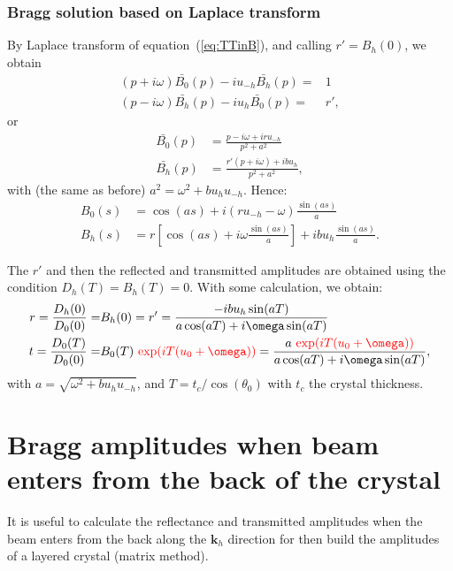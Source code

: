 \documentclass[preprint]{iucr}              %
\newcommand{\inred}[1]{{\color{red}#1}}
\begin{document}
\subsubsection{Bragg solution based on Laplace transform}By Laplace transform of equation~(\ref{eq:TTinB}), and calling \inred{$r'=B_h(0)$}, we obtain
\begin{subequations}
\label{eq:TTbraggLaplace}
\begin{align}
(p + i \omega) \bar{B_0}(p) - i u_{-h} \bar{B_h}(p)= & 1 \\
(p - i \omega) \bar{B_h}(p) - i u_{h} \bar{B_0}(p)= & r',
\end{align}
\end{subequations}
or 
\begin{subequations}
\begin{align}
\bar{B_0}(p) &= \frac{p - i \omega + i r u_{-h}}{p^2 + a^2} \\
\bar{B_h}(p) &= \frac{r' (p + i \omega) + i b u_h}{p^2 + a^2},
\end{align}
\end{subequations}
with \inred{(the same as before)} $a^2=\omega^2+b u_h u_{-h}$. Hence:
\begin{subequations}
\begin{align}
B_0(s) &= \cos(a s) + i (r u_{-h} - \omega) \frac{\sin(a s)}{a}\\
B_h(s) &= r [\cos(a s) + i \omega \frac{\sin(a s)}{a}] + i b u_h \frac{\sin(a s)}{a}.
\end{align}
\end{subequations}

The $r'$ and then the reflected and transmitted amplitudes are obtained using the condition $D_h(T)=B_h(T)=0$. With some calculation, we obtain: 
\begin{subequations}
\begin{align}
r=\frac{D_h(0)}{D_0(0)} =& B_h(0) = r' = \frac{-i b u_h \sin(a T)}{a \cos(a T) + i\omega \sin(a T)}\\
t =\frac{D_0(T)}{D_0(0)}= & B_0(T) ~ \inred{\exp(i T (u_0+\omega))} = \frac{a~\inred{\exp(i T (u_0+\omega))}}{a \cos(a T) + i\omega \sin(a T)} ,
\end{align}
\end{subequations}
with $a=\sqrt{\omega^2 + b u_h u_{-h}}$, and  
\inred{$T=t_c/\cos(\theta_0)$ with $t_c$ the crystal thickness. }


\section{Bragg amplitudes when beam enters from the back of the crystal}
\label{sec:braggfromtheback}
It is useful to calculate the reflectance and transmitted amplitudes when the beam enters from the back along the $\textbf{k}_h$ direction for then build the amplitudes of a layered crystal (matrix method). 
\end{document}
